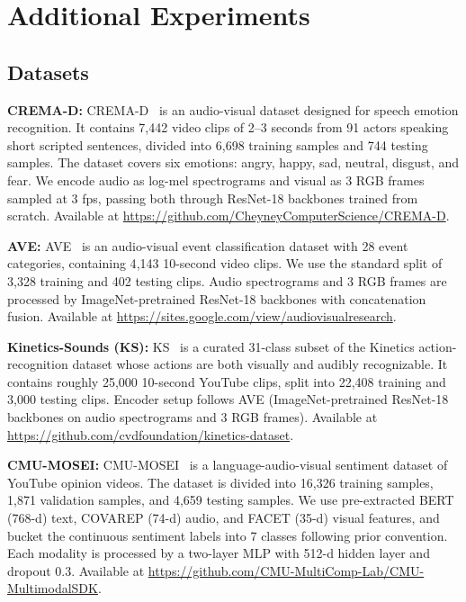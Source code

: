 \documentclass{article}
\begin{document}

\section{Additional Experiments}
\label{app:datasets}

\subsection{Datasets}
\label{app:datasets_list}

\noindent\textbf{CREMA-D:} CREMA-D~\citep{cao2014cremad} is an audio-visual dataset designed for speech emotion recognition. It contains 7{,}442 video clips of 2--3 seconds from 91 actors speaking short scripted sentences, divided into 6{,}698 training samples and 744 testing samples. The dataset covers six emotions: angry, happy, sad, neutral, disgust, and fear. We encode audio as log-mel spectrograms and visual as 3 RGB frames sampled at 3 fps, passing both through ResNet-18 backbones trained from scratch. Available at \url{https://github.com/CheyneyComputerScience/CREMA-D}.

\noindent\textbf{AVE:} AVE~\citep{tian2018ave} is an audio-visual event classification dataset with 28 event categories, containing 4{,}143 10-second video clips. We use the standard split of 3{,}328 training and 402 testing clips. Audio spectrograms and 3 RGB frames are processed by ImageNet-pretrained ResNet-18 backbones with concatenation fusion. Available at \url{https://sites.google.com/view/audiovisualresearch}.

\noindent\textbf{Kinetics-Sounds (KS):} KS~\citep{arandjelovic2017kinetics} is a curated 31-class subset of the Kinetics action-recognition dataset whose actions are both visually and audibly recognizable. It contains roughly 25{,}000 10-second YouTube clips, split into 22{,}408 training and 3{,}000 testing clips. Encoder setup follows AVE (ImageNet-pretrained ResNet-18 backbones on audio spectrograms and 3 RGB frames). Available at \url{https://github.com/cvdfoundation/kinetics-dataset}.

\noindent\textbf{CMU-MOSEI:} CMU-MOSEI~\citep{zadeh2018mosei} is a language-audio-visual sentiment dataset of YouTube opinion videos. The dataset is divided into 16{,}326 training samples, 1{,}871 validation samples, and 4{,}659 testing samples. We use pre-extracted BERT (768-d) text, COVAREP (74-d) audio, and FACET (35-d) visual features, and bucket the continuous sentiment labels into 7 classes following prior convention. Each modality is processed by a two-layer MLP with 512-d hidden layer and dropout $0.3$. Available at \url{https://github.com/CMU-MultiComp-Lab/CMU-MultimodalSDK}.
\end{document}
